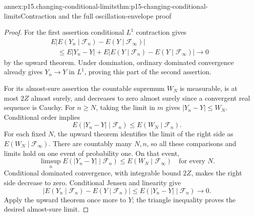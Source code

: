 \begin{annexitem}{annex:p15.changing-conditional-limits}{thm:p15-changing-conditional-limits}{Contraction and the full oscillation-envelope proof}
\begin{proof}
For the first assertion conditional \(L^1\) contraction gives
\[
 \begin{split}
 &E|E(Y_n\mid\mathcal F_n)-E(Y\mid\mathcal F_\infty)|\\
 &\quad\leq E|Y_n-Y|
       +E|E(Y\mid\mathcal F_n)-E(Y\mid\mathcal F_\infty)|
                      \longrightarrow0
 \end{split}
\]
by the upward theorem. Under domination, ordinary dominated convergence
already gives \(Y_n\to Y\) in \(L^1\), proving this part of the second assertion.

For its almost-sure assertion the countable supremum \(W_N\) is
measurable, is at most \(2Z\) almost surely, and decreases to zero
almost surely since a convergent real sequence is Cauchy.
For \(n\geq N\), taking the limit in \(m\) gives
\(|Y_n-Y|\leq W_N\). Conditional order implies
\[
                  E(|Y_n-Y|\mid\mathcal F_n)
                           \leq E(W_N\mid\mathcal F_n).
\]
For each fixed \(N\), the upward theorem identifies the limit of the
right side as \(E(W_N\mid\mathcal F_\infty)\).
There are countably many \(N,n\), so all these comparisons and limits
hold on one event of probability one. On that event,
\[
       \limsup_n E(|Y_n-Y|\mid\mathcal F_n)
                    \leq E(W_N\mid\mathcal F_\infty)
                                    \quad\text{for every }N.
\]
Conditional dominated convergence, with integrable bound \(2Z\),
makes the right side decrease to zero. Conditional Jensen and linearity
give
\[
 |E(Y_n\mid\mathcal F_n)-E(Y\mid\mathcal F_n)|
                         \leq E(|Y_n-Y|\mid\mathcal F_n)\longrightarrow0.
\]
Apply the upward theorem once more to \(Y\); the triangle inequality
proves the desired almost-sure limit.
\end{proof}
\end{annexitem}


